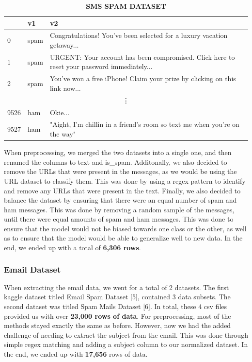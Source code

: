 \documentclass{article}
\begin{document}
\begin{table}[htbp]
    \centering
    \caption{\textbf{SMS SPAM DATASET}}
    \begin{tabular}{lll}
    \toprule
     & v1 & v2 \\
    \midrule
    0 & spam & Congratulations! You've been selected for a luxury vacation getaway... \\
    1 & spam & URGENT: Your account has been compromised. Click here to reset your password immediately... \\
    2 & spam & You've won a free iPhone! Claim your prize by clicking on this link now... \\
    \multicolumn{3}{c}{\vdots} \\ %
    9526 & ham & Okie... \\
    9527 & ham & "Aight, I'm chillin in a friend's room so text me when you're on the way" \\
    \bottomrule
    \end{tabular}
    \label{tab:csv_sample}
\end{table}

\noindent
When preprocessing, we merged the two datasets into a single one, and then renamed the columns to text and is\_spam. Additonally, we also decided to remove the URLs that were present in the messages, as we would be using the URL dataset to classify them. This was done by using a regex pattern to identify and remove any URLs that were present in the text. Finally, we also decided to balance the dataset by ensuring that there were an equal number of spam and ham messages. This was done by removing a random sample of the messages, until there were equal amounts of spam and ham messages. This was done to ensure that the model would not be biased towards one class or the other, as well as to ensure that the model would be able to generalize well to new data. In the end, we ended up with a total of \textbf{6,306 rows}.

\subsubsection{Email Dataset}

When extracting the email data, we went for a total of 2 datasets. The first kaggle dataset titled Email Spam Dataset [5], contained 3 data subsets. The second dataset was titled Spam Mails Dataset [6]. In total, these 4 csv files provided us with over \textbf{23,000 rows of data}. 
\newline
\newline
\noindent
For preprocessing, most of the methods stayed exactly the same as before. However, now we had the added challenge of needing to extract the subject from the email. This was done through simple regex matching and adding a subject column to our normalized dataset. In the end, we ended up with \textbf{17,656} rows of data.
\end{document}
